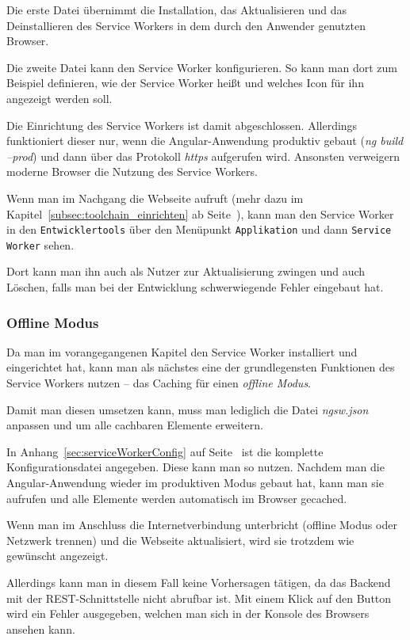 Die erste Datei übernimmt die Installation, das Aktualisieren und das Deinstallieren des Service Workers in dem
durch den Anwender genutzten Browser.

Die zweite Datei kann den Service Worker konfigurieren. So kann man dort zum Beispiel definieren, wie der Service Worker
heißt und welches Icon für ihn angezeigt werden soll.

Die Einrichtung des Service Workers ist damit abgeschlossen. Allerdings funktioniert dieser nur, wenn die
Angular-Anwendung produktiv gebaut (\textit{ng build --prod}) und dann über das Protokoll \textit{https} aufgerufen
wird. Ansonsten verweigern moderne Browser die Nutzung des Service Workers.

Wenn man im Nachgang die Webseite aufruft (mehr dazu im Kapitel~\ref{subsec:toolchain_einrichten} ab
Seite~\pageref{subsec:toolchain_einrichten}), kann man den Service Worker in den \texttt{Entwicklertools} über den
Menüpunkt \texttt{Applikation} und dann \texttt{Service Worker} sehen.

Dort kann man ihn auch als Nutzer zur Aktualisierung zwingen und auch Löschen, falls man bei der Entwicklung
schwerwiegende Fehler eingebaut hat.

\subsubsection{Offline Modus}
Da man im vorangegangenen Kapitel den Service Worker installiert und eingerichtet hat, kann man als nächstes eine der
grundlegensten Funktionen des Service Workers nutzen -- das Caching für einen \textit{offline Modus}.

Damit man diesen umsetzen kann, muss man lediglich die Datei \textit{ngsw.json} anpassen und um alle cachbaren Elemente
erweitern.

In Anhang~\ref{sec:serviceWorkerConfig} auf Seite~\pageref{sec:serviceWorkerConfig} ist die komplette
Konfigurationsdatei angegeben. Diese kann man so nutzen. Nachdem man die Angular-Anwendung wieder im produktiven Modus
gebaut hat, kann man sie aufrufen und alle Elemente werden automatisch im Browser gecached.

Wenn man im Anschluss die Internetverbindung unterbricht (offline Modus oder Netzwerk trennen) und die Webseite
aktualisiert, wird sie trotzdem wie gewünscht angezeigt.

Allerdings kann man in diesem Fall keine Vorhersagen tätigen, da das Backend mit der REST-Schnittstelle nicht abrufbar
ist. Mit einem Klick auf den Button wird ein Fehler ausgegeben, welchen man sich in der Konsole des Browsers ansehen
kann.


